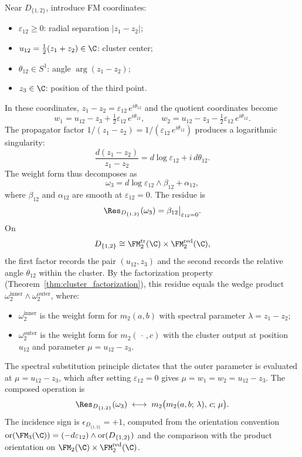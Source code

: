 \begin{computation}[$D_{\{1,2\}}$ residue]
\label{comp:D12}
Near $D_{\{1,2\}}$, introduce FM coordinates:
\begin{itemize}
\item $\varepsilon_{12} \geq 0$: radial separation $|z_1 - z_2|$;
\item $u_{12} = \tfrac{1}{2}(z_1 + z_2) \in \C$: cluster center;
\item $\theta_{12} \in S^1$: angle $\arg(z_1 - z_2)$;
\item $z_3 \in \C$: position of the third point.
\end{itemize}
In these coordinates, $z_1 - z_2 = \varepsilon_{12}\, e^{i\theta_{12}}$ and the quotient coordinates become
\[
w_1 = u_{12} - z_3 + \tfrac{1}{2}\varepsilon_{12}\, e^{i\theta_{12}}, \qquad
w_2 = u_{12} - z_3 - \tfrac{1}{2}\varepsilon_{12}\, e^{i\theta_{12}}.
\]
The propagator factor $1/(z_1 - z_2) = 1/(\varepsilon_{12}\, e^{i\theta_{12}})$ produces a logarithmic singularity:
\[
\frac{d(z_1 - z_2)}{z_1 - z_2} = d\log\varepsilon_{12} + i\, d\theta_{12}.
\]
The weight form thus decomposes as
\[
\omega_3 = d\log\varepsilon_{12} \wedge \beta_{12} + \alpha_{12},
\]
where $\beta_{12}$ and $\alpha_{12}$ are smooth at $\varepsilon_{12} = 0$. The residue is
\[
\Res_{D_{\{1,2\}}}(\omega_3) = \beta_{12}\big|_{\varepsilon_{12}=0}.
\]
On
\[
D_{\{1,2\}}\cong
\FM_2^{\mathrm{tr}}(\C)\times\FM_2^{\mathrm{red}}(\C),
\]
the first factor records the pair \((u_{12},z_3)\) and the second
records the relative angle \(\theta_{12}\) within the cluster. By the
factorization property (Theorem~\ref{thm:cluster_factorization}), this
residue equals the wedge product
\(\omega_2^{\text{inner}}\wedge\omega_2^{\text{outer}}\), where:
\begin{itemize}
\item $\omega_2^{\text{inner}}$ is the weight form for $m_2(a, b)$ with spectral parameter $\lambda = z_1 - z_2$;
\item $\omega_2^{\text{outer}}$ is the weight form for $m_2(\,\cdot\,, c)$ with the cluster output at position $u_{12}$ and parameter $\mu = u_{12} - z_3$.
\end{itemize}
The spectral substitution principle dictates that the outer parameter is evaluated at $\mu = u_{12} - z_3$, which after setting $\varepsilon_{12} = 0$ gives $\mu = w_1 = w_2 = u_{12} - z_3$. The composed operation is
\[
\Res_{D_{\{1,2\}}}(\omega_3) \;\longleftrightarrow\; m_2\bigl(m_2(a, b;\, \lambda),\, c;\, \mu\bigr).
\]
The incidence sign is \(\epsilon_{D_{\{1,2\}}}=+1\),
computed from the orientation convention
\(\operatorname{or}(\FM_3(\C))=(-d\varepsilon_{12})
\wedge\operatorname{or}(D_{\{1,2\}})\) and the comparison with
the product orientation on
\(\FM_2(\C)\times\FM_2^{\mathrm{red}}(\C)\).
\end{computation}

